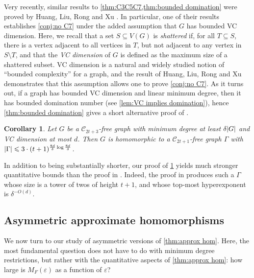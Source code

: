 \documentclass[reqno, english, 12pt]{amsart}
\theoremstyle{plain}
\newtheorem{corollary}[theorem]{Corollary}
\theoremstyle{remark}
\DeclarePairedDelimiter{\abs}{\lvert}{\rvert}
\renewcommand{\leq}{\leqslant}
\newcommand\C{\mathscr{C}}
\begin{document}
Very recently, similar results to \cref{thm:C3C5C7,thm:bounded domination} were proved by Huang, Liu, Rong and Xu \cite{2502.09576}. In particular, one of their results \cite[Theorem 1.2]{2502.09576} establishes \cref{conj:no C7} under the added assumption that $G$ has bounded VC dimension. Here, we recall that a set $S \subseteq V(G)$ is \emph{shattered} if, for all $T \subseteq S$, there is a vertex adjacent to all vertices in $T$, but not adjacent to any vertex in $S \setminus T$, and that the \emph{VC dimension} of $G$ is defined as the maximum size of a shattered subset. VC dimension is a natural and widely studied notion of ``bounded complexity'' for a graph, and the result of Huang, Liu, Rong and Xu demonstrates that this assumption allows one to prove \cref{conj:no C7}. As it turns out, if a graph has bounded VC dimension and linear minimum degree, then it has bounded domination number (see \cref{lem:VC implies domination}), hence \cref{thm:bounded domination} gives a short alternative proof of \cite[Theorem 1.2]{2502.09576}.
\begin{corollary}\label{cor:bounded VC}
    Let $G$ be a $\C_{2t+3}$-free graph with minimum degree at least $\delta\abs G$ and VC dimension at most $d$. Then $G$ is homomorphic to a $\C_{2t+1}$-free graph $\Gamma$ with $\abs\Gamma \leq 3 \cdot (t+1)^{\frac{8d}{\delta} \log \frac{8d}{\delta}}$.
\end{corollary}
In addition to being substantially shorter, our proof of \cref{cor:bounded VC} yields much stronger quantitative bounds than the proof in \cite{2502.09576}. Indeed, the proof in \cite{2502.09576} produces such a $\Gamma$ whose size is a tower of twos of height $t+1$, and whose top-most hyperexponent is $\delta^{-O(d)}$.



\subsection{Asymmetric approximate homomorphisms}
We now turn to our study of asymmetric versions of \cref{thm:approx hom}. Here, the most fundamental question does not have to do with minimum degree restrictions, but rather with the quantitative aspects of \cref{thm:approx hom}: how large is $M_F(\varepsilon)$ as a function of $\varepsilon$?
\end{document}

